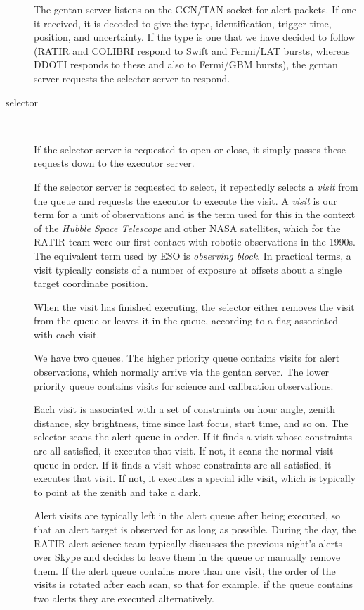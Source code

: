 \documentclass{article}
\newcommand{\server}[1]{{\ttfamily #1}}
\newcommand{\request}[1]{{\ttfamily #1}}
\begin{document}
\begin{description}
The \server{gcntan} server listens on the GCN/TAN socket for alert packets. If one it received, it is decoded to give the type, identification, trigger time, position, and uncertainty. If the type is one that we have decided to follow (RATIR and COLIBRI respond to Swift and Fermi/LAT bursts, whereas DDOTI responds to these and also to Fermi/GBM bursts), the \server{gcntan} server requests the \server{selector} server to respond.

\item[\server{selector}]~

If the \server{selector} server is requested to \request{open} or \request{close}, it simply passes these requests down to the \server{executor} server. 

If the \server{selector} server is requested to \server{select}, it repeatedly selects a \emph{visit} from the queue and requests the executor to execute the visit. A \emph{visit} is our term for a unit of observations and is the term used for this in the context of the \emph{Hubble Space Telescope} and other NASA satellites, which for the RATIR team were our first contact with robotic observations in the 1990s. The equivalent term used by ESO is \emph{observing block}. In practical terms, a visit typically consists of a number of exposure at offsets about a single target coordinate position.

When the visit has finished executing, the selector either removes the visit from the queue or leaves it in the queue, according to a flag associated with each visit.

We have two queues. The higher priority queue contains visits for alert observations, which normally arrive via the \server{gcntan} server. The lower priority queue contains visits for science and calibration observations.

Each visit is associated with a set of constraints on hour angle, zenith distance, sky brightness, time since last focus, start time, and so on. The selector scans the alert queue in order. If it finds a visit whose constraints are all satisfied, it executes that visit. If not, it scans the normal visit queue in order. If it finds a visit whose constraints are all satisfied, it executes that visit. If not, it executes a special idle visit, which is typically to point at the zenith and take a dark.

Alert visits are typically left in the alert queue after being executed, so that an alert target is observed for as long as possible. During the day, the RATIR alert science team typically discusses the previous night’s alerts over Skype and decides to leave them in the queue or manually remove them. If the alert queue contains more than one visit, the order of the visits is rotated after each scan, so that for example, if the queue contains two alerts they are executed alternatively.


\end{description}
\end{document}
